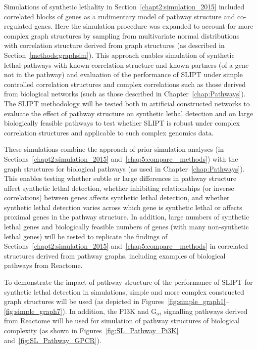 Simulations of synthetic lethality in Section~\ref{chapt2:simulation_2015} included correlated blocks of genes as a rudimentary model of pathway structure and co-regulated genes. Here the simulation procedure was expanded to account for more complex graph structures by sampling from multivariate normal distributions with correlation structure derived from graph structures (as described in Section~\ref{methods:graphsim}). This approach enables simulation of synthetic lethal pathways with known correlation structure and known partners (of a gene not in the pathway) and evaluation of the performance of \gls{SLIPT} under simple controlled correlation structures and complex correlations such as those derived from biological networks (such as those described in Chapter~\ref{chap:Pathways}). The \gls{SLIPT} methodology will be tested both in artificial constructed networks to evaluate the effect of pathway structure on synthetic lethal detection and on large biologically feasible pathways to test whether \gls{SLIPT} is robust under complex correlation structures and applicable to such complex genomics data.

These simulations combine the approach of prior simulation analyses (in Sections~\ref{chapt2:simulation_2015} and~\ref{chap5:compare_ methods}) with the graph structures for biological pathways (as used in Chapter~\ref{chap:Pathways}). This enables testing whether subtle or large differences in pathway structure affect synthetic lethal detection, whether inhibiting relationships (or inverse correlations) between genes affects synthetic lethal detection, and whether synthetic lethal detection varies across which gene is synthetic lethal or affects proximal genes in the pathway structure. In addition, large numbers of synthetic lethal genes and biologically feasible numbers of genes (with many non-synthetic lethal genes) will be tested to replicate the findings of Sections~\ref{chapt2:simulation_2015} and~\ref{chap5:compare_ methods} in correlated structures derived from pathway graphs, including examples of biological pathways from Reactome.

To demonstrate the impact of pathway structure of the performance of \gls{SLIPT} for synthetic lethal detection in simulations, simple and more complex constructed graph structures will be used (as depicted in Figures~\ref{fig:simple_graph1}\nobreakdash--\ref{fig:simple_graph7}). In addition, the \gls{PI3K} and G$_{\alpha i}$ signalling pathways derived from Reactome will be used for simulation of pathway structures of biological complexity (as shown in Figures~\ref{fig:SL_Pathway_Pi3K} and~\ref{fig:SL_Pathway_GPCR}).

